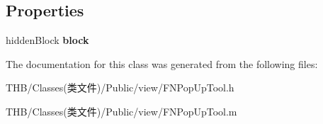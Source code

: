 \subsection*{Properties}
\begin{DoxyCompactItemize}
\item 
\mbox{\label{interface_f_n_pop_up_tool_a3fae85576289068e3fc5a88c8985021f}} 
hidden\+Block {\bfseries block}
\end{DoxyCompactItemize}


The documentation for this class was generated from the following files\+:\begin{DoxyCompactItemize}
\item 
T\+H\+B/\+Classes(类文件)/\+Public/view/F\+N\+Pop\+Up\+Tool.\+h\item 
T\+H\+B/\+Classes(类文件)/\+Public/view/F\+N\+Pop\+Up\+Tool.\+m\end{DoxyCompactItemize}
